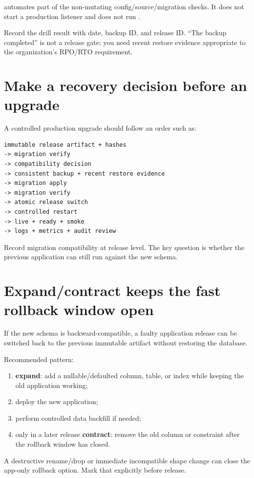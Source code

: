  automates part of the non-mutating config/source/migration checks. It does not start a production listener and does not run .

Record the drill result with date, backup ID, and release ID. ``The backup completed'' is not a release gate; you need recent restore evidence appropriate to the organization's RPO/RTO requirement.

\section{Make a recovery decision before an upgrade}

A controlled production upgrade should follow an order such as:

\begin{lstlisting}
immutable release artifact + hashes
-> migration verify
-> compatibility decision
-> consistent backup + recent restore evidence
-> migration apply
-> migration verify
-> atomic release switch
-> controlled restart
-> live + ready + smoke
-> logs + metrics + audit review
\end{lstlisting}

Record migration compatibility at release level. The key question is whether the previous application can still run against the new schema.

\section{Expand/contract keeps the fast rollback window open}

If the new schema is backward-compatible, a faulty application release can be switched back to the previous immutable artifact without restoring the database.

Recommended pattern:

\begin{enumerate}
  \item \textbf{expand}: add a nullable/defaulted column, table, or index while keeping the old application working;
  \item deploy the new application;
  \item perform controlled data backfill if needed;
  \item only in a later release \textbf{contract}: remove the old column or constraint after the rollback window has closed.
\end{enumerate}

A destructive rename/drop or immediate incompatible shape change can close the app-only rollback option. Mark that explicitly before release.

